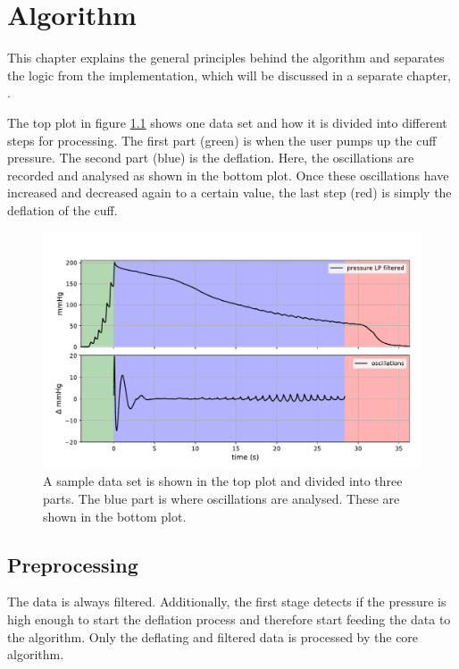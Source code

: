 \chapter{Algorithm}\label{cp:algo}

This chapter explains the general principles behind the algorithm and separates the logic from the implementation, which will be discussed in a separate chapter, . 

The top plot in figure \ref{fig:algoOverview} shows one data set and how it is divided into different steps for processing. The first part (green) is when the user pumps up the cuff pressure. The second part (blue) is the deflation. Here, the oscillations are recorded and analysed as shown in the bottom plot. Once these oscillations have increased and decreased again to a certain value, the last step (red) is simply the deflation of the cuff. 


\begin{figure}[ht]
\centering
\includegraphics[width=\textwidth]{figures/algo_overview.pdf}
\caption{A sample data set is shown in the top plot and divided into three parts. The blue part is where oscillations are analysed. These are shown in the bottom plot.}
\label{fig:algoOverview}
\end{figure}


\section{Preprocessing}
The data is always filtered. Additionally, the first stage detects if the pressure is high enough to start the deflation process and therefore start feeding the data to the algorithm. Only the deflating and filtered data is processed by the core algorithm. 

